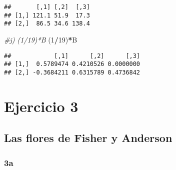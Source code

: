 \documentclass[
]{article}
\newenvironment{Shaded}{\begin{snugshade}}{\end{snugshade}}
\newcommand{\CommentTok}[1]{\textcolor[rgb]{0.56,0.35,0.01}{\textit{#1}}}
\newcommand{\DataTypeTok}[1]{\textcolor[rgb]{0.13,0.29,0.53}{#1}}
\newcommand{\DecValTok}[1]{\textcolor[rgb]{0.00,0.00,0.81}{#1}}
\newcommand{\KeywordTok}[1]{\textcolor[rgb]{0.13,0.29,0.53}{\textbf{#1}}}
\newcommand{\NormalTok}[1]{#1}
\newcommand{\OperatorTok}[1]{\textcolor[rgb]{0.81,0.36,0.00}{\textbf{#1}}}
\newcommand{\StringTok}[1]{\textcolor[rgb]{0.31,0.60,0.02}{#1}}
\begin{document}
\begin{verbatim}
##       [,1] [,2]  [,3]
## [1,] 121.1 51.9  17.3
## [2,]  86.5 34.6 138.4
\end{verbatim}

\begin{Shaded}
\begin{Highlighting}[]
  \CommentTok{#j) (1/19)*B}
\NormalTok{    (}\DecValTok{1}\OperatorTok{/}\DecValTok{19}\NormalTok{)}\OperatorTok{*}\NormalTok{B}
\end{Highlighting}
\end{Shaded}

\begin{verbatim}
##            [,1]      [,2]      [,3]
## [1,]  0.5789474 0.4210526 0.0000000
## [2,] -0.3684211 0.6315789 0.4736842
\end{verbatim}

\hypertarget{ejercicio-3}{%
\section{Ejercicio 3}\label{ejercicio-3}}

\hypertarget{las-flores-de-fisher-y-anderson}{%
\subsection{Las flores de Fisher y
Anderson}\label{las-flores-de-fisher-y-anderson}}

\hypertarget{a}{%
\subsubsection{3a}\label{a}}

\begin{Shaded}
\end{Shaded}
\end{document}
